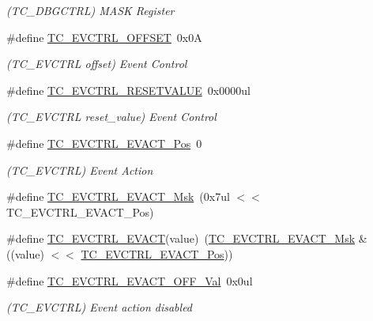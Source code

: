 \begin{DoxyCompactItemize}
\begin{DoxyCompactList}\small\item\em (T\+C\+\_\+\+D\+B\+G\+C\+T\+RL) M\+A\+SK Register \end{DoxyCompactList}\item 
\#define \mbox{\hyperlink{group___s_a_m_d21___t_c_ga73d8de62d36e71fdb668ff3461dbcc54}{T\+C\+\_\+\+E\+V\+C\+T\+R\+L\+\_\+\+O\+F\+F\+S\+ET}}~0x0A
\begin{DoxyCompactList}\small\item\em (T\+C\+\_\+\+E\+V\+C\+T\+RL offset) Event Control \end{DoxyCompactList}\item 
\#define \mbox{\hyperlink{group___s_a_m_d21___t_c_gab81c65bb678a57253551e864a9cf83be}{T\+C\+\_\+\+E\+V\+C\+T\+R\+L\+\_\+\+R\+E\+S\+E\+T\+V\+A\+L\+UE}}~0x0000ul
\begin{DoxyCompactList}\small\item\em (T\+C\+\_\+\+E\+V\+C\+T\+RL reset\+\_\+value) Event Control \end{DoxyCompactList}\item 
\#define \mbox{\hyperlink{group___s_a_m_d21___t_c_ga29f3c9802b04bc3c9e151e388abf2f08}{T\+C\+\_\+\+E\+V\+C\+T\+R\+L\+\_\+\+E\+V\+A\+C\+T\+\_\+\+Pos}}~0
\begin{DoxyCompactList}\small\item\em (T\+C\+\_\+\+E\+V\+C\+T\+RL) Event Action \end{DoxyCompactList}\item 
\#define \mbox{\hyperlink{group___s_a_m_d21___t_c_gaa7850522399769a9c537d974564547f7}{T\+C\+\_\+\+E\+V\+C\+T\+R\+L\+\_\+\+E\+V\+A\+C\+T\+\_\+\+Msk}}~(0x7ul $<$$<$ T\+C\+\_\+\+E\+V\+C\+T\+R\+L\+\_\+\+E\+V\+A\+C\+T\+\_\+\+Pos)
\item 
\#define \mbox{\hyperlink{group___s_a_m_d21___t_c_gaff25b879b46da9d6566b107f69c8f17b}{T\+C\+\_\+\+E\+V\+C\+T\+R\+L\+\_\+\+E\+V\+A\+CT}}(value)~(\mbox{\hyperlink{group___s_a_m_d21___t_c_gaa7850522399769a9c537d974564547f7}{T\+C\+\_\+\+E\+V\+C\+T\+R\+L\+\_\+\+E\+V\+A\+C\+T\+\_\+\+Msk}} \& ((value) $<$$<$ \mbox{\hyperlink{group___s_a_m_d21___t_c_ga29f3c9802b04bc3c9e151e388abf2f08}{T\+C\+\_\+\+E\+V\+C\+T\+R\+L\+\_\+\+E\+V\+A\+C\+T\+\_\+\+Pos}}))
\item 
\#define \mbox{\hyperlink{group___s_a_m_d21___t_c_ga34fd9cc9a5f397f3200ce035f6e7dc2b}{T\+C\+\_\+\+E\+V\+C\+T\+R\+L\+\_\+\+E\+V\+A\+C\+T\+\_\+\+O\+F\+F\+\_\+\+Val}}~0x0ul
\begin{DoxyCompactList}\small\item\em (T\+C\+\_\+\+E\+V\+C\+T\+RL) Event action disabled \end{DoxyCompactList}\item 

\end{DoxyCompactItemize}
